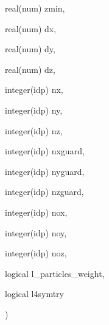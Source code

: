 {\begin{DoxyParamCaption}
\item[{real(num)}]{zmin, }
\item[{real(num)}]{dx, }
\item[{real(num)}]{dy, }
\item[{real(num)}]{dz, }
\item[{integer(idp)}]{nx, }
\item[{integer(idp)}]{ny, }
\item[{integer(idp)}]{nz, }
\item[{integer(idp)}]{nxguard, }
\item[{integer(idp)}]{nyguard, }
\item[{integer(idp)}]{nzguard, }
\item[{integer(idp)}]{nox, }
\item[{integer(idp)}]{noy, }
\item[{integer(idp)}]{noz, }
\item[{logical}]{l\+\_\+particles\+\_\+weight, }
\item[{logical}]{l4symtry}
\end{DoxyParamCaption}
)}\hypertarget{namespacediagnostics_a7d64ffee6339ffb7ca37adfe101c444d}{}\label{namespacediagnostics_a7d64ffee6339ffb7ca37adfe101c444d}
